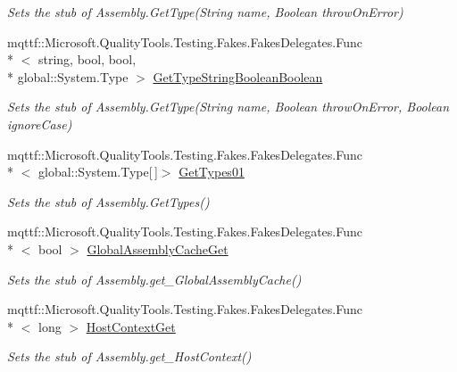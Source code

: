 \begin{DoxyCompactItemize}
\begin{DoxyCompactList}\small\item\em Sets the stub of Assembly.\-Get\-Type(\-String name, Boolean throw\-On\-Error)\end{DoxyCompactList}\item 
mqttf\-::\-Microsoft.\-Quality\-Tools.\-Testing.\-Fakes.\-Fakes\-Delegates.\-Func\\*
$<$ string, bool, bool, \\*
global\-::\-System.\-Type $>$ \hyperlink{class_system_1_1_reflection_1_1_fakes_1_1_stub_assembly_ac0e3780ee867a851d84881d6a321393d}{Get\-Type\-String\-Boolean\-Boolean}
\begin{DoxyCompactList}\small\item\em Sets the stub of Assembly.\-Get\-Type(\-String name, Boolean throw\-On\-Error, Boolean ignore\-Case)\end{DoxyCompactList}\item 
mqttf\-::\-Microsoft.\-Quality\-Tools.\-Testing.\-Fakes.\-Fakes\-Delegates.\-Func\\*
$<$ global\-::\-System.\-Type\mbox{[}$\,$\mbox{]}$>$ \hyperlink{class_system_1_1_reflection_1_1_fakes_1_1_stub_assembly_a9aed6f783b1bbe0526554f5b13f9c04c}{Get\-Types01}
\begin{DoxyCompactList}\small\item\em Sets the stub of Assembly.\-Get\-Types()\end{DoxyCompactList}\item 
mqttf\-::\-Microsoft.\-Quality\-Tools.\-Testing.\-Fakes.\-Fakes\-Delegates.\-Func\\*
$<$ bool $>$ \hyperlink{class_system_1_1_reflection_1_1_fakes_1_1_stub_assembly_a9f529e8c80997d13f2f064ee901df6b2}{Global\-Assembly\-Cache\-Get}
\begin{DoxyCompactList}\small\item\em Sets the stub of Assembly.\-get\-\_\-\-Global\-Assembly\-Cache()\end{DoxyCompactList}\item 
mqttf\-::\-Microsoft.\-Quality\-Tools.\-Testing.\-Fakes.\-Fakes\-Delegates.\-Func\\*
$<$ long $>$ \hyperlink{class_system_1_1_reflection_1_1_fakes_1_1_stub_assembly_af21ba53cdb381fd428cc39fdd3e35e25}{Host\-Context\-Get}
\begin{DoxyCompactList}\small\item\em Sets the stub of Assembly.\-get\-\_\-\-Host\-Context()\end{DoxyCompactList}\item 

\end{DoxyCompactItemize}
